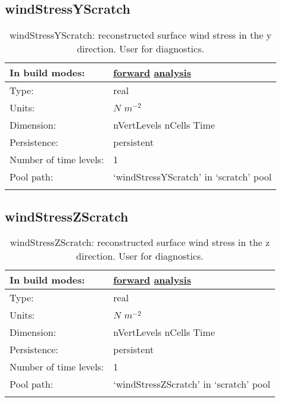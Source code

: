 \subsection[windStressYScratch]{windStressYScratch}
\label{subsec:var_sec_scratch_windStressYScratch}
\begin{center}
\begin{longtable}{| p{2.0in} | p{4.0in} |}
        \hline 
        In build modes: & \hyperref[subsec:forward_var_tab_scratch]{forward} \hyperref[subsec:analysis_var_tab_scratch]{analysis} \\
        \hline 
        Type: & real \\
        \hline 
        Units: & $N$ $m^{-2}$ \\
        \hline 
        Dimension: & nVertLevels nCells Time \\
        \hline 
        Persistence: & persistent \\
        \hline 
        Number of time levels: & 1 \\
        \hline 
            Pool path: & `windStressYScratch' in `scratch' pool \\
		 \hline 
    \caption{windStressYScratch: reconstructed surface wind stress in the y direction. User for diagnostics.}
\end{longtable}
\end{center}
\subsection[windStressZScratch]{windStressZScratch}
\label{subsec:var_sec_scratch_windStressZScratch}
\begin{center}
\begin{longtable}{| p{2.0in} | p{4.0in} |}
        \hline 
        In build modes: & \hyperref[subsec:forward_var_tab_scratch]{forward} \hyperref[subsec:analysis_var_tab_scratch]{analysis} \\
        \hline 
        Type: & real \\
        \hline 
        Units: & $N$ $m^{-2}$ \\
        \hline 
        Dimension: & nVertLevels nCells Time \\
        \hline 
        Persistence: & persistent \\
        \hline 
        Number of time levels: & 1 \\
        \hline 
            Pool path: & `windStressZScratch' in `scratch' pool \\
		 \hline 
    \caption{windStressZScratch: reconstructed surface wind stress in the z direction. User for diagnostics.}
\end{longtable}
\end{center}
